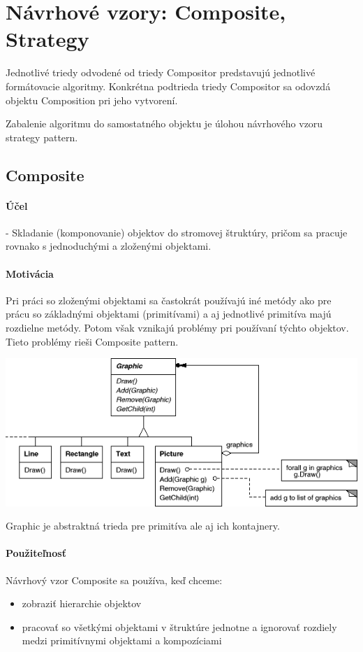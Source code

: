 \section{Návrhové vzory: Composite, Strategy}

Jednotlivé triedy odvodené od triedy Compositor predstavujú jednotlivé formátovacie algoritmy. Konkrétna podtrieda triedy Compositor sa odovzdá objektu Composition pri jeho vytvorení.

Zabalenie algoritmu do samostatného objektu je úlohou návrhového vzoru strategy pattern.
	\subsection{Composite}
		\paragraph{Účel}
			 - Skladanie (komponovanie) objektov do stromovej štruktúry, pričom sa pracuje rovnako s jednoduchými a zloženými objektami.

		\paragraph{Motivácia}
		Pri práci so zloženými objektami sa častokrát používajú iné metódy ako pre prácu so základnými objektami (primitívami) a aj jednotlivé primitíva majú rozdielne metódy. Potom však vznikajú problémy pri používaní týchto objektov. Tieto problémy rieši Composite pattern.


		\includegraphics[width=.9\textwidth]{images/programovanie/composite1}

		Graphic je abstraktná trieda pre primitíva ale aj ich kontajnery.


		\paragraph{Použiteľnosť}
		Návrhový vzor Composite sa používa, keď chceme:
			\begin{itemize}
				\item zobraziť hierarchie objektov
				\item pracovať so všetkými objektami v štruktúre jednotne a ignorovať rozdiely medzi primitívnymi objektami a kompozíciami
			\end{itemize}
